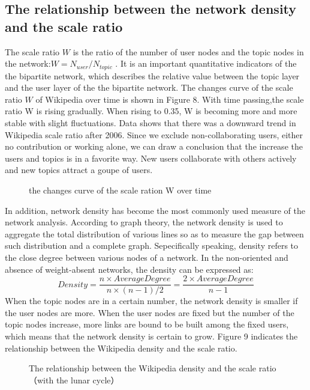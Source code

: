 \documentclass{elsarticle}
\begin{document}
\subsection{The relationship between the network density and the scale ratio}
\label{sec:relat-betw-netw}
 The scale
ratio $W$ is the ratio of the number of user nodes and the topic nodes in
the network:$W=N_{user}/N_{topic}$ . It is an important quantitative
indicators of the the bipartite network, which describes the relative
value between the topic layer and the user layer of the the bipartite
network. The changes curve of the scale ratio $W$ of Wikipedia over time
is shown in Figure 8. With time passing,the scale ratio W is rising
gradually. When rising to 0.35, W is becoming more and more stable
with slight fluctuations. Data shows that there was a downward trend in
Wikipedia scale ratio after 2006. Since we exclude non-collaborating
users, either no contribution or working alone, we can draw a
conclusion that the increase the users and topics is in a favorite
way. New users collaborate with others actively and new topics attract
a goupe of users.
\begin{figure}[htpb]
  \centering
  \scalebox{0.3}{\texttt{[image: 08]}}
  \caption{the changes curve of the scale ration W over time}
\end{figure}
In addition, network density has become the most commonly used measure
of the network analysis. According to graph theory, the network
density is used to aggregate the total distribution of various lines
so as to measure the gap between such distribution and a complete
graph. Sepecifically speaking, density refers to the close degree between various nodes of a network. In the non-oriented and absence of weight-absent  networks, the density can be expressed as:
\begin{equation}
  \label{eq:3}
  Density=\frac{n\times AverageDegree}{n\times(n-1)/2}=\frac{2\times AverageDegree}{n-1}
\end{equation}
When the topic nodes are in a certain number, the network density is
smaller if the user nodes are more. When the user nodes are fixed but the
number of the topic nodes increase, more links are bound to be built
among the fixed users, which means that the network density is certain
to grow. Figure 9 indicates the relationship between the Wikipedia density and the scale ratio. 
\begin{figure}[htpb]
  \centering
  \scalebox{0.3}{\texttt{[image: 09]}}
  \caption{The relationship between the Wikipedia density and the scale ratio （with the lunar cycle）}
\end{figure}
\end{document}
